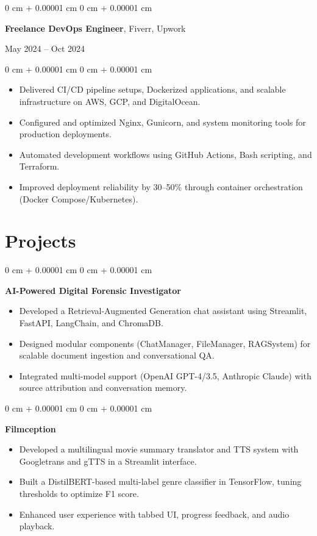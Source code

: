\documentclass[10pt, letterpaper]{article}
\newenvironment{highlights}{
    \begin{itemize}[
        topsep=0.10 cm,
        parsep=0.10 cm,
        partopsep=0pt,
        itemsep=0pt,
        leftmargin=0 cm + 10pt
    ]
}{
    \end{itemize}
}
\newenvironment{onecolentry}{
    \begin{adjustwidth}{
        0 cm + 0.00001 cm
    }{
        0 cm + 0.00001 cm
    }
}{
    \end{adjustwidth}
}
\newenvironment{twocolentry}[2][]{
    \onecolentry
    \def\secondColumn{#2}
    \setcolumnwidth{\fill, 4.5 cm}
    \begin{paracol}{2}
}{
    \switchcolumn \raggedleft \secondColumn
    \end{paracol}
    \endonecolentry
}
\begin{document}
\vspace{0.10 cm}

\begin{twocolentry}{May 2024 – Oct 2024}
    \textbf{Freelance DevOps Engineer}, Fiverr, Upwork
\end{twocolentry}
\vspace{0.10 cm}
\begin{onecolentry}
    \begin{highlights}
        \item Delivered CI/CD pipeline setups, Dockerized applications, and scalable infrastructure on AWS, GCP, and DigitalOcean.
        \item Configured and optimized Nginx, Gunicorn, and system monitoring tools for production deployments.
        \item Automated development workflows using GitHub Actions, Bash scripting, and Terraform.
        \item Improved deployment reliability by 30–50\% through container orchestration (Docker Compose/Kubernetes).
    \end{highlights}
\end{onecolentry}

\section{Projects}
\vspace{0.10 cm}
\begin{onecolentry}
    \textbf{AI-Powered Digital Forensic Investigator}
    \begin{highlights}
        \item Developed a Retrieval-Augmented Generation chat assistant using Streamlit, FastAPI, LangChain, and ChromaDB.
        \item Designed modular components (ChatManager, FileManager, RAGSystem) for scalable document ingestion and conversational QA.
        \item Integrated multi-model support (OpenAI GPT-4/3.5, Anthropic Claude) with source attribution and conversation memory.
    \end{highlights}
\end{onecolentry}
\vspace{0.10 cm}

\begin{onecolentry}
    \textbf{Filmception}
    \begin{highlights}
        \item Developed a multilingual movie summary translator and TTS system with Googletrans and gTTS in a Streamlit interface.
        \item Built a DistilBERT-based multi-label genre classifier in TensorFlow, tuning thresholds to optimize F1 score.
        \item Enhanced user experience with tabbed UI, progress feedback, and audio playback.
    \end{highlights}
\end{onecolentry}
\vspace{0.10 cm}
\end{document}

